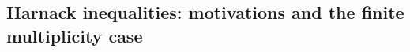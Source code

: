 \documentclass[11pt,a4paper,reqno]{amsart}
\theoremstyle{definition}
\renewcommand{\a}{\operatorname{a}}
\newcommand{\B}{\mathbb{B}^n}
\newcommand{\R}{\mathbb{R}}
\newcommand{\Leb}{\mathrm {d}{\mathcal L}^{n}}
\newcommand{\blue}{\color{blau}}
\newcounter{komcounter}
\numberwithin{komcounter}{section}
\newcommand{\komT}[1]{{\bf \blue [\refstepcounter{komcounter}\thekomcounter (by T): #1]}}
\begin{document}
\subsection{Harnack inequalities: motivations and the finite multiplicity case} \hfill
\smallskip
 
\end{document}
